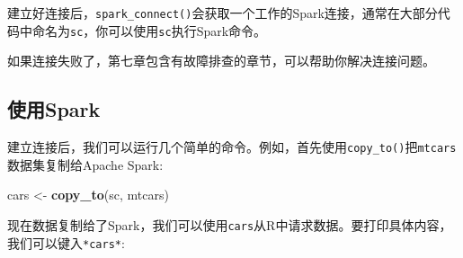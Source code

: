 \documentclass[
]{article}
\newenvironment{Shaded}{\begin{snugshade}}{\end{snugshade}}
\newcommand{\KeywordTok}[1]{\textcolor[rgb]{0.13,0.29,0.53}{\textbf{#1}}}
\newcommand{\NormalTok}[1]{#1}
\newcommand{\StringTok}[1]{\textcolor[rgb]{0.31,0.60,0.02}{#1}}
\begin{document}
建立好连接后，\texttt{spark\_connect()}会获取一个工作的Spark连接，通常在大部分代码中命名为\texttt{sc}，你可以使用\texttt{sc}执行Spark命令。

如果连接失败了，第七章包含有故障排查的章节，可以帮助你解决连接问题。

\hypertarget{ux4f7fux7528spark}{%
\subsection{使用Spark}\label{ux4f7fux7528spark}}

建立连接后，我们可以运行几个简单的命令。例如，首先使用\texttt{copy\_to()}把\texttt{mtcars}数据集复制给Apache
Spark:

\begin{Shaded}
\begin{Highlighting}[]
\NormalTok{cars <-}\StringTok{ }\KeywordTok{copy_to}\NormalTok{(sc, mtcars)}
\end{Highlighting}
\end{Shaded}

现在数据复制给了Spark，我们可以使用\texttt{cars}从R中请求数据。要打印具体内容，我们可以键入\texttt{*cars*}:
\end{document}
